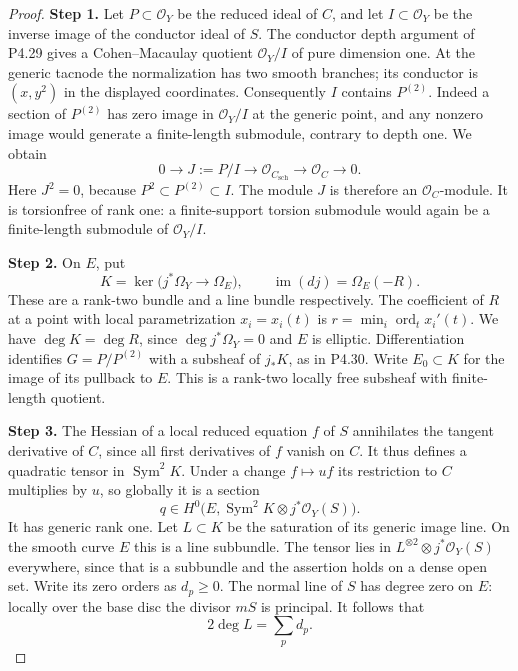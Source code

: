 \begin{proof}
\noindent\textbf{Step 1.} Let $P\subset\mathcal O_Y$ be the reduced ideal of $C$, and let
$I\subset\mathcal O_Y$ be the inverse image of the conductor ideal
of $S$. The conductor depth argument of P4.29 gives a
Cohen--Macaulay quotient $\mathcal O_Y/I$ of pure dimension one.
At the generic tacnode the normalization has two smooth branches;
its conductor is $(x,y^2)$ in the displayed coordinates.
Consequently $I$ contains $P^{(2)}$. Indeed a section of $P^{(2)}$
has zero image in $\mathcal O_Y/I$ at the generic point, and any
nonzero image would generate a finite-length submodule, contrary
to depth one. We obtain
\[
 0\longrightarrow J:=P/I\longrightarrow
 \mathcal O_{C_{\mathrm{sch}}}\longrightarrow\mathcal O_C
 \longrightarrow0.
\]
Here $J^2=0$, because $P^2\subset P^{(2)}\subset I$.
The module $J$ is therefore an $\mathcal O_C$-module. It is
torsionfree of rank one: a finite-support torsion submodule would
again be a finite-length submodule of $\mathcal O_Y/I$.

\noindent\textbf{Step 2.} On $E$, put
\[
 K=\ker\bigl(j^*\Omega_Y\longrightarrow\Omega_E\bigr),
 \qquad\operatorname{im}(dj)=\Omega_E(-R).
\]
These are a rank-two bundle and a line bundle respectively.
The coefficient of $R$ at a point with local parametrization
$x_i=x_i(t)$ is $r=\min_i\operatorname{ord}_t x_i'(t)$.
We have $\deg K=\deg R$, since $\deg j^*\Omega_Y=0$
and $E$ is elliptic. Differentiation identifies
$G=P/P^{(2)}$ with a subsheaf of $j_*K$, as in P4.30.
Write $E_0\subset K$ for the image of its pullback to $E$.
This is a rank-two locally free subsheaf with finite-length
quotient.

\noindent\textbf{Step 3.} The Hessian of a local reduced equation $f$ of $S$ annihilates
the tangent derivative of $C$, since all first derivatives of
$f$ vanish on $C$. It thus defines a quadratic tensor in
$\operatorname{Sym}^2K$. Under a change $f\mapsto u f$ its
restriction to $C$ multiplies by $u$, so globally it is a section
\[
 q\in H^0\bigl(E,\operatorname{Sym}^2K\otimes j^*\mathcal O_Y(S)\bigr).
\]
It has generic rank one. Let $L\subset K$ be the saturation of
its generic image line. On the smooth curve $E$ this is a line
subbundle. The tensor lies in $L^{\otimes2}\otimes
j^*\mathcal O_Y(S)$ everywhere, since that is a subbundle and
the assertion holds on a dense open set. Write its zero orders
as $d_p\geq0$. The normal line of $S$ has degree zero on $E$:
locally over the base disc the divisor $mS$ is principal.
It follows that
\[
 2\deg L=\sum_p d_p.
\]


\end{proof}
